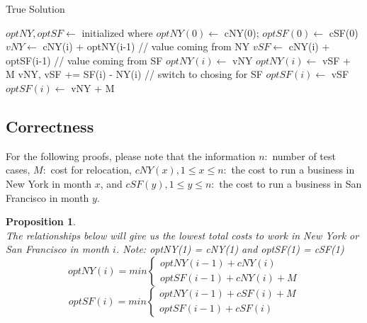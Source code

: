 \documentclass[12pt]{article}
\newtheorem{proposition}[theorem]{Proposition}
\begin{document}
\begin{algorithm}[H]
\caption{True Solution}
\begin{algorithmic}
        \State $optNY, optSF \gets$ initialized where $optNY(0) \gets$ cNY(0); $optSF(0) \gets$ cSF(0)
            \State $vNY \gets$ cNY(i) + optNY(i-1) // value coming from NY
            \State $vSF \gets$ cNY(i) + optSF(i-1) // value coming from SF
                \State $optNY(i) \gets$ vNY
            \Else
                \State $optNY(i) \gets$ vSF + M
            \EndIf
            \State vNY, vSF += SF(i) - NY(i) // switch to chosing for SF
                \State $optSF(i) \gets$ vSF
            \Else
                \State $optSF(i) \gets$ vNY + M
            \EndIf
        \EndFor
        \State {}
    \EndProcedure
\end{algorithmic}
\end{algorithm}


\subsection{Correctness}
For the following proofs, please note that the information $n:$ number of test cases, $M:$ cost for
relocation, $cNY(x), 1 \leq x \leq n :$ the cost to run a business in New York in month $x$, and
$cSF(y), 1 \leq y \leq n :$ the cost to run a business in San Francisco in month $y$.

\begin{proposition}
~ \\ \indent The relationships below will give us the lowest total costs to work in New York or San Francisco
in month $i$. \textit{Note: optNY(1) = cNY(1) and optSF(1) = cSF(1)}
\[  optNY(i) = min
    \begin{cases}
        optNY(i-1) + cNY(i)     \\
        optSF(i-1) + cNY(i) + M
    \end{cases}
\]
\[  optSF(i) = min
    \begin{cases}
      optNY(i-1) + cSF(i) + M  \\
      optSF(i-1) + cSF(i)
    \end{cases}
\]


\end{proposition}
\end{document}
